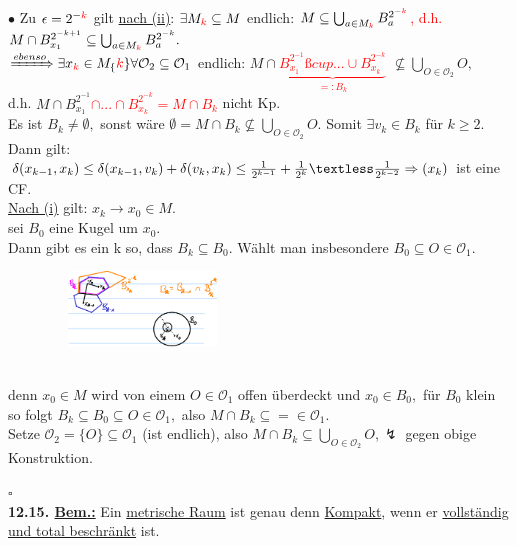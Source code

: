 \documentclass[]{scrartcl}
\begin{document}
	$\bullet$ Zu $\epsilon = 2^{-\textcolor{red}{k}}$ gilt \ul{nach (ii)}: $\exists M_{\textcolor{red}{k}} \subseteq M$ endlich: $M\subseteq \bigcup_{a\in M_{\textcolor{red}{k}}}B_a^{2^{-\textcolor{red}{k}}}$\textcolor{red}{, d.h. $M\cap B_{x_1}^{2^{-k+1}}\subseteq \bigcup_{a\in M_{\textcolor{red}{k}}} B_a^{2^{-k}}.$}\\
	$\xRightarrow{ebenso}\exists x_{\textcolor{red}{k}}\in M_\{\textcolor{red}{k}\} \forall \mathcal{O}_2\subseteq\mathcal{O}_1$ endlich: $M\cap $\textcolor{red}{$\underbrace{B_{x_1}^{2^{-1}} ßcup...\cup B_{x_k}^{2^{-k}}}_{=:B_k}$} $\nsubseteq \bigcup_{O \in \mathcal{O}_2}O,$\\
	d.h. $M\cap B_{x_1}^{2^{-1}}$\textcolor{red}{$\cap...\cap B_{x_k}^{2^{-k}}=M\cap B_k$} nicht Kp.\\
	Es ist $B_k \neq \emptyset,$ sonst wäre $\emptyset=M\cap B_k \nsubseteq \bigcup_{O \in \mathcal{O}_2}O.$ Somit $\exists v_k \in B_k$ für $k\geq2.$\\
	Dann gilt: $\delta(x_{k-1},x_{k})\leq \delta(x_{k-1},v_k)+\delta(v_k,x_k)\leq \frac{1}{2^{k-1}}+\frac{1}{2^k}\textless \frac{1}{2^{k-2}}\Rightarrow(x_k)$ ist eine CF.\\
	\ul{Nach (i)} gilt: $x_k\rightarrow x_0 \in M.$\\
	sei $B_0$ eine Kugel um $x_0$.\\
	Dann gibt es ein k so, dass $B_k \subseteq B_0.$ Wählt man insbesondere $B_0\subseteq O\in \mathcal{O}_1.$\\
	\begin{figure}[h]  
		\includegraphics[width=5cm,height=2cm]{bsp kap 12.14.2}
	\end{figure}\\
	\textopencorner denn $x_0\in M$ wird von einem $O\in \mathcal{O}_1$ offen überdeckt und $x_0\in B_0,$ für $B_0$ klein\textcorner\\
	so folgt $B_k \subseteq B_0\subseteq O \in \mathcal{O}_1,$ also $M\cap B_k \subseteq = \in \mathcal{O}_1.$\\
	Setze $\mathcal{O}_2=\{O\}\subseteq \mathcal{O}_1$ (ist endlich), also $M\cap B_k\subseteq \bigcup_{O \in \mathcal{O}_2}O, \lightning$ gegen obige Konstruktion.\\
	\strut\hfill$\square$\\
	\textbf{12.15. \underline{Bem.:}} Ein \ul{metrische Raum} ist genau denn \ul{Kompakt}, wenn er \ul{vollständig und total beschränkt} ist.\\
\end{document}
